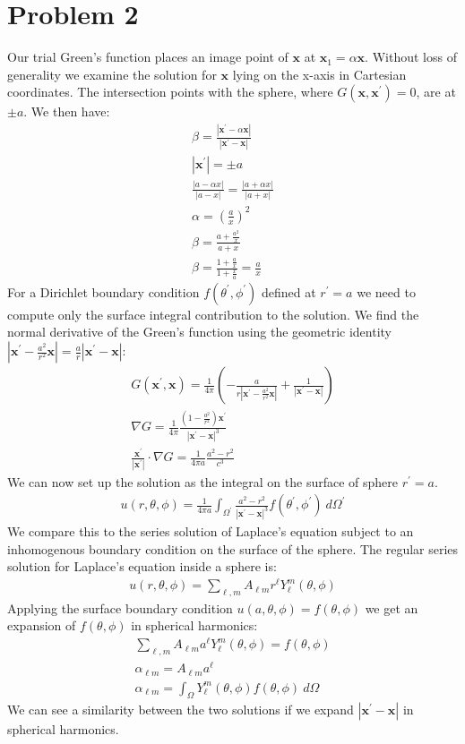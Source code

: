 \documentclass[a4paper,12pt]{article}
\numberwithin{equation}{section}
\begin{document}
\section{Problem 2}
Our trial Green's function places an image point of $\textbf{x}$ at $\textbf{x}_1=\alpha \textbf{x}$.
Without loss of generality we examine the solution for $\textbf{x}$ lying on the x-axis in Cartesian coordinates.
The intersection points with the sphere, where $G(\textbf{x}, \textbf{x}^{'})=0$, are at $\pm a$.
We then have:
\begin{gather}
 \beta=\frac{|\textbf{x}^{'}-\alpha \textbf{x}|}{|\textbf{x}^{'}-\textbf{x} |}\\
 |\textbf{x}^{'}|=\pm a\\
 \frac{|a-\alpha x|}{|a-x|} = \frac{|a+\alpha x|}{|a+x|}\\
 \alpha = (\frac{a}{x})^2\\
 \beta = \frac{a+\frac{a^2}{x}}{a+x}\\
 \beta = \frac{1+\frac{a}{x}}{1+\frac{x}{a}}=\frac{a}{x}
\end{gather}
For a Dirichlet boundary condition $f(\theta^{'}, \phi^{'})$ defined at $r^{'}=a$ we need to compute only the surface integral contribution to the solution.
We find the normal derivative of the Green's function using the geometric identity $ |\textbf{x}^{'}-\frac{a^2}{r^2}\textbf{x}|=\frac{a}{r}|\textbf{x}^{'}-\textbf{x}|$:
\begin{gather}
 G(\textbf{x}^{'}, \textbf{x})=\frac{1}{4\pi}
     (-\frac{a}{r|\textbf{x}^{'}-\frac{a^2}{r^2}\textbf{x}|}+\frac{1}{|\textbf{x}^{'}-\textbf{x} |} )\\
 \nabla G = \frac{1}{4\pi}\frac{(1-\frac{a^2}{r^2})\textbf{x}^{'}}{|\textbf{x}^{'}-\textbf{x} |^3}\\
 \frac{\textbf{x}^{'}}{|\textbf{x}^{'}|} \cdot \nabla G = 
      \frac{1}{4\pi a} \frac{a^2-r^2}{c^3}
\end{gather}
We can now set up the solution as the integral on the surface of sphere $r^{'}=a$. 
\begin{gather}     
 u(r,\theta,\phi) = \frac{1}{4\pi a}\int_{\Omega^{'}}
          \frac{a^2-r^2}{|\textbf{x}^{'}-\textbf{x} |^3}f(\theta^{'}, \phi^{'})\ d\Omega^{'}
\end{gather}
We compare this to the series solution of Laplace's equation subject to an inhomogenous boundary condition on the surface of the sphere.
The regular series solution for Laplace's equation inside a sphere is:
\begin{gather}
 u(r,\theta,\phi)=\sum_{\ell,m}A_{\ell m}r^{\ell}Y_\ell^m(\theta,\phi)
\end{gather}
Applying the surface boundary condition $u(a,\theta,\phi)=f(\theta, \phi)$ we get an expansion of $f(\theta, \phi)$ in spherical harmonics:
\begin{gather}
 \sum_{\ell,m}A_{\ell m}a^{\ell}Y_\ell^m(\theta,\phi)=f(\theta, \phi)\\
 \alpha_{\ell m} = A_{\ell m}a^{\ell}\\
 \alpha_{\ell m} = \int_{\Omega}Y_\ell^m(\theta,\phi)f(\theta, \phi)\ d\Omega 
\end{gather}
We can see a similarity between the two solutions if we expand $|\textbf{x}^{'}-\textbf{x} |$ in spherical harmonics.
\end{document}
